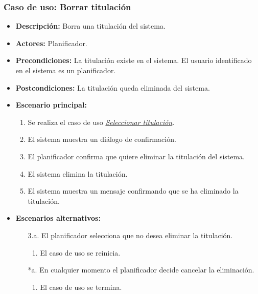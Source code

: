 \subsubsection*{Caso de uso: Borrar titulación}
\begin{itemize}
\item{\bf Descripción:} Borra una titulación del sistema.
\item{\bf Actores:} Planificador.
\item{\bf Precondiciones:} La titulación existe en el sistema. El usuario identificado en el sistema es un planificador.
\item{\bf Postcondiciones:} La titulación queda eliminada del sistema.
\item{\bf Escenario principal:}
	\begin{enumerate}
	\item Se realiza el caso de uso  {\em\hyperref[select_titulacion]{Seleccionar titulación}}.
	\item El sistema muestra un diálogo de confirmación.
	\item El planificador confirma que quiere eliminar la titulación del sistema.
	\item El sistema elimina la titulación.
	\item El sistema muestra un mensaje confirmando que se ha eliminado la titulación.
	\end{enumerate}
\item{\bf Escenarios alternativos:}
	\begin{itemize}
	\item[3.a.] El planificador selecciona que no desea eliminar la titulación.
		\begin{enumerate}
		\item El caso de uso se reinicia.
		\end{enumerate}
	\item[*a.] En cualquier momento el planificador decide cancelar la eliminación.
		\begin{enumerate}
		\item El caso de uso se termina.
		\end{enumerate}
	\end{itemize}
\end{itemize}



